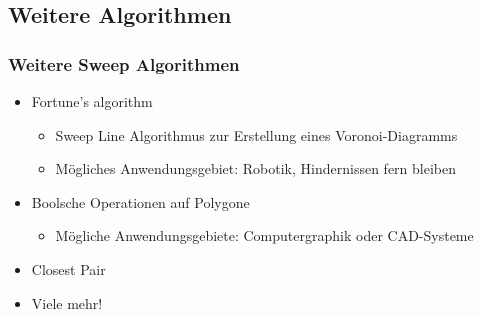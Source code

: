 \subsection{Weitere Algorithmen}
\begin{frame}
	\frametitle{{Weitere Sweep Algorithmen}}
	\begin{itemize}
		\pause
		\item Fortune's algorithm
		\begin{itemize}
			\item Sweep Line Algorithmus zur Erstellung eines Voronoi-Diagramms
			\pause			
			\item M\"ogliches Anwendungsgebiet: Robotik, Hindernissen fern bleiben
		\end{itemize}
		\pause
		\item Boolsche Operationen auf Polygone
		\begin{itemize}
			\item M\"ogliche Anwendungsgebiete: Computergraphik oder CAD-Systeme
		\end{itemize}
		\pause
		\item Closest Pair
		\pause
		\item Viele mehr!
	\end{itemize}
\end{frame}

